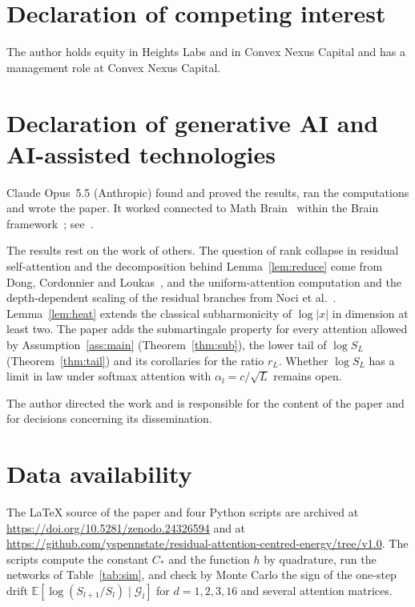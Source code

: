 \documentclass[11pt]{amsart}
\theoremstyle{definition}
\theoremstyle{remark}
\numberwithin{equation}{section}
\newcommand{\EE}{\mathbb{E}}
\newcommand{\cG}{\mathcal{G}}
\begin{document}
\section*{Declaration of competing interest}
The author holds equity in Heights Labs and in Convex Nexus Capital and has a management role at Convex Nexus Capital.

\section*{Declaration of generative AI and AI-assisted technologies}
Claude Opus~5.5 (Anthropic) found and proved the results, ran the computations and wrote the paper. It worked connected to Math Brain~\cite{MathBrainRepo} within the Brain framework~\cite{BrainFramework}; see~\cite{MathBrainPaper}.

The results rest on the work of others. The question of rank collapse in residual self-attention and the decomposition behind Lemma~\ref{lem:reduce} come from Dong, Cordonnier and Loukas~\cite{DCL}, and the uniform-attention computation and the depth-dependent scaling of the residual branches from Noci et al.~\cite{NABOSL}. Lemma~\ref{lem:heat} extends the classical subharmonicity of $\log|x|$ in dimension at least two. The paper adds the submartingale property for every attention allowed by Assumption~\ref{ass:main} (Theorem~\ref{thm:sub}), the lower tail of $\log S_L$ (Theorem~\ref{thm:tail}) and its corollaries for the ratio $r_L$. Whether $\log S_L$ has a limit in law under softmax attention with $\alpha_l=c/\sqrt L$ remains open.

The author directed the work and is responsible for the content of the paper and for decisions concerning its dissemination.

\section*{Data availability}
The \LaTeX{} source of the paper and four Python scripts are archived at \url{https://doi.org/10.5281/zenodo.24326594} and at \url{https://github.com/yspennstate/residual-attention-centred-energy/tree/v1.0}. The scripts compute the constant $C_*$ and the function $h$ by quadrature, run the networks of Table~\ref{tab:sim}, and check by Monte Carlo the sign of the one-step drift $\EE[\log(S_{l+1}/S_l)\mid\cG_l]$ for $d=1,2,3,16$ and several attention matrices.

\appendix

\end{document}
